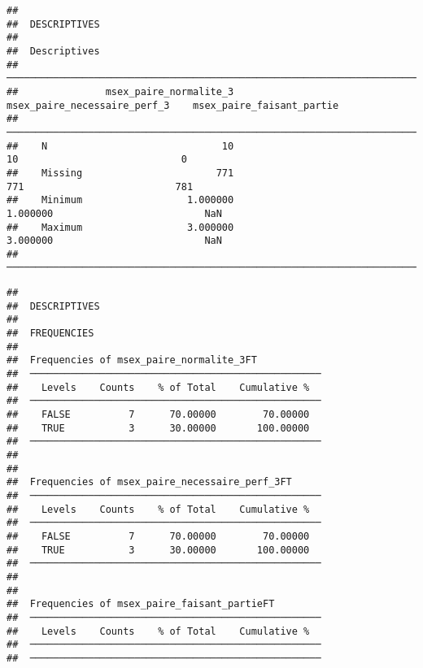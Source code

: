 \documentclass[
]{article}
\begin{document}
\begin{verbatim}
## 
##  DESCRIPTIVES
## 
##  Descriptives                                                                                       
##  ────────────────────────────────────────────────────────────────────────────────────────────────── 
##               msex_paire_normalite_3    msex_paire_necessaire_perf_3    msex_paire_faisant_partie   
##  ────────────────────────────────────────────────────────────────────────────────────────────────── 
##    N                              10                              10                            0   
##    Missing                       771                             771                          781   
##    Minimum                  1.000000                        1.000000                          NaN   
##    Maximum                  3.000000                        3.000000                          NaN   
##  ──────────────────────────────────────────────────────────────────────────────────────────────────
\end{verbatim}

\begin{verbatim}
## 
##  DESCRIPTIVES
## 
##  FREQUENCIES
## 
##  Frequencies of msex_paire_normalite_3FT            
##  ────────────────────────────────────────────────── 
##    Levels    Counts    % of Total    Cumulative %   
##  ────────────────────────────────────────────────── 
##    FALSE          7      70.00000        70.00000   
##    TRUE           3      30.00000       100.00000   
##  ────────────────────────────────────────────────── 
## 
## 
##  Frequencies of msex_paire_necessaire_perf_3FT      
##  ────────────────────────────────────────────────── 
##    Levels    Counts    % of Total    Cumulative %   
##  ────────────────────────────────────────────────── 
##    FALSE          7      70.00000        70.00000   
##    TRUE           3      30.00000       100.00000   
##  ────────────────────────────────────────────────── 
## 
## 
##  Frequencies of msex_paire_faisant_partieFT         
##  ────────────────────────────────────────────────── 
##    Levels    Counts    % of Total    Cumulative %   
##  ────────────────────────────────────────────────── 
##  ──────────────────────────────────────────────────
\end{verbatim}
\end{document}
